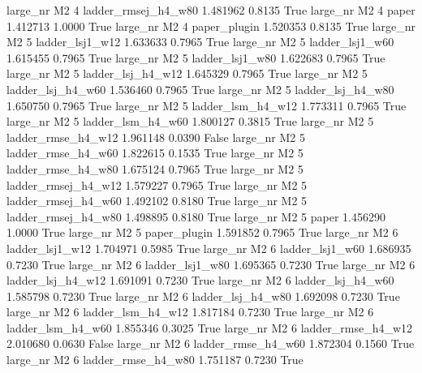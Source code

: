   large_nr       M2                 4 ladder_rmsej_h4_w80   1.481962      0.8135    True
  large_nr       M2                 4               paper   1.412713      1.0000    True
  large_nr       M2                 4        paper_plugin   1.520353      0.8135    True
  large_nr       M2                 5     ladder_lsj1_w12   1.633633      0.7965    True
  large_nr       M2                 5     ladder_lsj1_w60   1.615455      0.7965    True
  large_nr       M2                 5     ladder_lsj1_w80   1.622683      0.7965    True
  large_nr       M2                 5   ladder_lsj_h4_w12   1.645329      0.7965    True
  large_nr       M2                 5   ladder_lsj_h4_w60   1.536460      0.7965    True
  large_nr       M2                 5   ladder_lsj_h4_w80   1.650750      0.7965    True
  large_nr       M2                 5   ladder_lsm_h4_w12   1.773311      0.7965    True
  large_nr       M2                 5   ladder_lsm_h4_w60   1.800127      0.3815    True
  large_nr       M2                 5  ladder_rmse_h4_w12   1.961148      0.0390   False
  large_nr       M2                 5  ladder_rmse_h4_w60   1.822615      0.1535    True
  large_nr       M2                 5  ladder_rmse_h4_w80   1.675124      0.7965    True
  large_nr       M2                 5 ladder_rmsej_h4_w12   1.579227      0.7965    True
  large_nr       M2                 5 ladder_rmsej_h4_w60   1.492102      0.8180    True
  large_nr       M2                 5 ladder_rmsej_h4_w80   1.498895      0.8180    True
  large_nr       M2                 5               paper   1.456290      1.0000    True
  large_nr       M2                 5        paper_plugin   1.591852      0.7965    True
  large_nr       M2                 6     ladder_lsj1_w12   1.704971      0.5985    True
  large_nr       M2                 6     ladder_lsj1_w60   1.686935      0.7230    True
  large_nr       M2                 6     ladder_lsj1_w80   1.695365      0.7230    True
  large_nr       M2                 6   ladder_lsj_h4_w12   1.691091      0.7230    True
  large_nr       M2                 6   ladder_lsj_h4_w60   1.585798      0.7230    True
  large_nr       M2                 6   ladder_lsj_h4_w80   1.692098      0.7230    True
  large_nr       M2                 6   ladder_lsm_h4_w12   1.817184      0.7230    True
  large_nr       M2                 6   ladder_lsm_h4_w60   1.855346      0.3025    True
  large_nr       M2                 6  ladder_rmse_h4_w12   2.010680      0.0630   False
  large_nr       M2                 6  ladder_rmse_h4_w60   1.872304      0.1560    True
  large_nr       M2                 6  ladder_rmse_h4_w80   1.751187      0.7230    True
